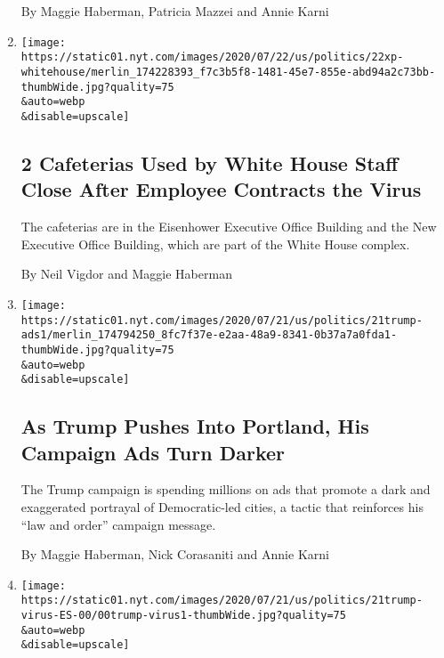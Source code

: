 \begin{enumerate}
  By Maggie Haberman, Patricia Mazzei and Annie Karni
\item
  \href{/2020/07/22/us/politics/white-house-employee-covid-19.html}{}

  \texttt{[image: https://static01.nyt.com/images/2020/07/22/us/politics/22xp-whitehouse/merlin\_174228393\_f7c3b5f8-1481-45e7-855e-abd94a2c73bb-thumbWide.jpg?quality=75\\\&auto=webp\\\&disable=upscale]}

  \hypertarget{2-cafeterias-used-by-white-house-staff-close-after-employee-contracts-the-virus}{%
  \subsection{2 Cafeterias Used by White House Staff Close After
  Employee Contracts the
  Virus}\label{2-cafeterias-used-by-white-house-staff-close-after-employee-contracts-the-virus}}

  The cafeterias are in the Eisenhower Executive Office Building and the
  New Executive Office Building, which are part of the White House
  complex.

  By Neil Vigdor and Maggie Haberman
\item
  \href{/2020/07/21/us/politics/trump-portland-federal-agents.html}{}

  \texttt{[image: https://static01.nyt.com/images/2020/07/21/us/politics/21trump-ads1/merlin\_174794250\_8fc7f37e-e2aa-48a9-8341-0b37a7a0fda1-thumbWide.jpg?quality=75\\\&auto=webp\\\&disable=upscale]}

  \hypertarget{as-trump-pushes-into-portland-his-campaign-ads-turn-darker}{%
  \subsection{As Trump Pushes Into Portland, His Campaign Ads Turn
  Darker}\label{as-trump-pushes-into-portland-his-campaign-ads-turn-darker}}

  The Trump campaign is spending millions on ads that promote a dark and
  exaggerated portrayal of Democratic-led cities, a tactic that
  reinforces his ``law and order'' campaign message.

  By Maggie Haberman, Nick Corasaniti and Annie Karni
\item
  \href{/es/2020/07/21/espanol/estados-unidos/donald-trump-coronavirus-republicanos.html}{}

  \texttt{[image: https://static01.nyt.com/images/2020/07/21/us/politics/21trump-virus-ES-00/00trump-virus1-thumbWide.jpg?quality=75\\\&auto=webp\\\&disable=upscale]}


\end{enumerate}
